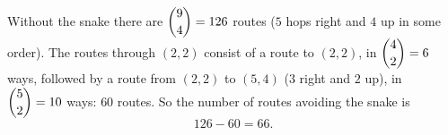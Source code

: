 Without the snake there are $\dbinom94=126$ routes ($5$ hops right and $4$ up in some order). The routes through $(2,2)$ consist of a route to $(2,2)$, in $\dbinom42=6$ ways, followed by a route from $(2,2)$ to $(5,4)$ ($3$ right and $2$ up), in $\dbinom52=10$ ways: $60$ routes. So the number of routes avoiding the snake is
\[126-60=\boxed{66}.\]

